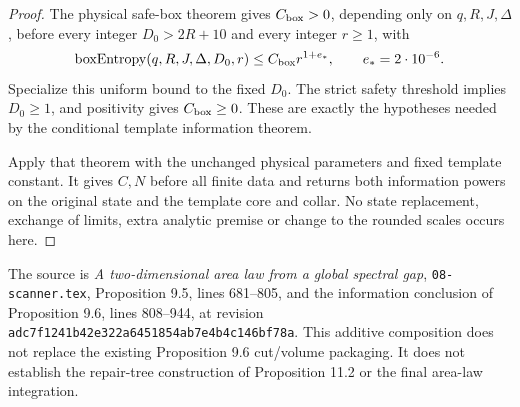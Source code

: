 \begin{proof}
    \leanok
    The physical safe-box theorem gives $C_{\rm box}>0$, depending only
    on $q,R,J,\Delta$, before every integer $D_0>2R+10$ and every
    integer $r\geq1$, with
    \[
        \operatorname{boxEntropy}(q,R,J,\Delta,D_0,r)
        \leq C_{\rm box}r^{1+e_*},\qquad e_*=2\cdot10^{-6}.
    \]
    Specialize this uniform bound to the fixed $D_0$.  The strict safety
    threshold implies $D_0\geq1$, and positivity gives
    $C_{\rm box}\geq0$.  These are exactly the hypotheses needed by the
    conditional template information theorem.

    Apply that theorem with the unchanged physical parameters and fixed
    template constant.  It gives $C,N$ before all finite data and
    returns both information powers on the original state and the
    template core and collar.  No state replacement, exchange of limits,
    extra analytic premise or change to the rounded scales occurs here.
\end{proof}

The source is \emph{A two-dimensional area law from a global spectral gap},
\texttt{08-scanner.tex}, Proposition 9.5, lines 681--805, and the
information conclusion of Proposition 9.6, lines 808--944, at revision
\texttt{adc7f1241b42e322a6451854ab7e4b4c146bf78a}.
This additive composition does not replace the existing Proposition 9.6
cut/volume packaging.  It does not establish the repair-tree construction
of Proposition 11.2 or the final area-law integration.

